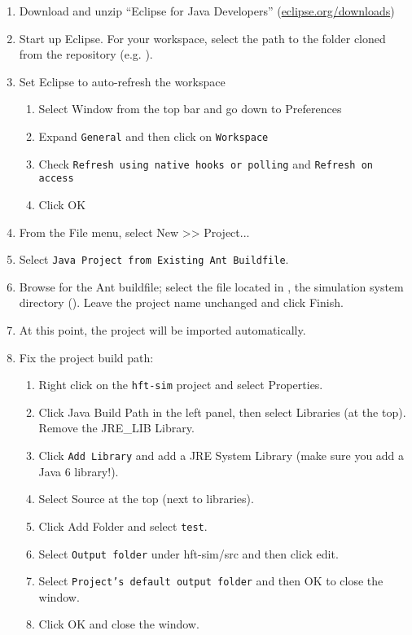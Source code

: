 \documentclass[11pt]{article}
\begin{document}
\begin{enumerate}
\item Download and unzip ``Eclipse for Java Developers'' (\href{http://www.eclipse.org/downloads/}{eclipse.org/downloads})
\item Start up Eclipse. For your workspace, select the path to
  the  folder cloned from the repository (e.g. ).
\item Set Eclipse to auto-refresh the workspace
  \begin{enumerate}
  \item Select Window from the top bar and go down to Preferences
  \item Expand \texttt{General} and then click on \texttt{Workspace}
  \item Check \texttt{Refresh using native hooks or polling} and \texttt{Refresh on access}
  \item Click OK
  \end{enumerate}
  
\item From the File menu, select New >> Project...
\item Select \texttt{Java Project from Existing Ant Buildfile}.
\item Browse for the Ant buildfile; select the  file located in , the simulation system directory
  (). Leave the project name unchanged and
  click Finish.
\item At this point, the project will be imported automatically.
\item Fix the project build path:
  \begin{enumerate}
  \item Right click on the \texttt{hft-sim} project and select Properties.
  \item Click Java Build Path in the left panel, then select Libraries (at the
    top). Remove the JRE\_LIB Library.
  \item Click \texttt{Add Library} and add a JRE System Library (make sure you add a Java 6 library!).
  \item Select Source at the top (next to libraries).
  \item Click Add Folder and select \texttt{test}.
  \item Select \texttt{Output folder} under hft-sim/src and then click edit.
  \item Select \texttt{Project's default output folder} and then OK to close the window.
  \item Click OK and close the window.
  \end{enumerate}


\end{enumerate}
\end{document}
